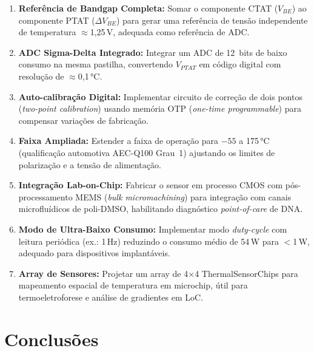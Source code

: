 \documentclass[12pt,a4paper]{article}
\begin{document}
\begin{enumerate}[leftmargin=2em,label=\textbf{TF\arabic*.}]
  \item \textbf{Referência de Bandgap Completa:} Somar o componente CTAT ($V_{BE}$) ao
        componente PTAT ($\Delta V_{BE}$) para gerar uma referência de tensão independente
        de temperatura $\approx$1,25\,V, adequada como referência de ADC.

  \item \textbf{ADC Sigma-Delta Integrado:} Integrar um ADC de 12~bits de baixo consumo
        na mesma pastilha, convertendo $V_{PTAT}$ em código digital com resolução de
        $\approx$0,1\,°C.

  \item \textbf{Auto-calibração Digital:} Implementar circuito de correção de dois pontos
        (\textit{two-point calibration}) usando memória OTP (\textit{one-time programmable})
        para compensar variações de fabricação.

  \item \textbf{Faixa Ampliada:} Estender a faixa de operação para $-55$ a 175\,°C
        (qualificação automotiva AEC-Q100 Grau~1) ajustando os limites de polarização e
        a tensão de alimentação.

  \item \textbf{Integração Lab-on-Chip:} Fabricar o sensor em processo CMOS com
        pós-processamento MEMS (\textit{bulk micromachining}) para integração com canais
        microfluídicos de poli-DMSO, habilitando diagnóstico \textit{point-of-care} de DNA.

  \item \textbf{Modo de Ultra-Baixo Consumo:} Implementar modo \textit{duty-cycle} com
        leitura periódica (ex.: 1\,Hz) reduzindo o consumo médio de 54\,\textmu W para
        $<$1\,\textmu W, adequado para dispositivos implantáveis.

  \item \textbf{Array de Sensores:} Projetar um array de 4$\times$4 ThermalSensorChips
        para mapeamento espacial de temperatura em microchip, útil para termoeletroforese
        e análise de gradientes em LoC.
\end{enumerate}

\section{Conclusões}
\end{document}
